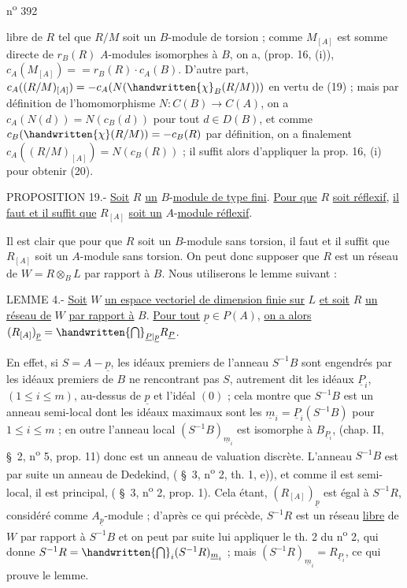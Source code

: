 n\textsuperscript{o} 392

libre de $R$ tel que $R/M$ soit un $B$-module de torsion ; comme $M_{[A]}$ est somme directe de $r_B(R)$ $A$-modules isomorphes à $B$, on a, (prop. 16, (i)), $c_A(M_{[A]})={}=r_B(R)\cdot c_A(B)$. D'autre part, $c_A((R/M)_{[A]})=-c_A(N(\handwritten{\chi}_B(R/M)))$ en vertu de (19) ; mais par définition de l'homomorphisme $N:C(B)\longrightarrow C(A)$, on a $c_A(N(d))=N(c_B(d))$ pour tout $d\in D(B)$, et comme $c_B(\handwritten{\chi}(R/M))=-c_B(R)$ par définition, on a finalement $c_A((R/M)_{[A]})=N(c_B(R))$ ; il suffit alors d'appliquer la prop. 16, (i) pour obtenir (20).

PROPOSITION 19.- \uline{Soit} $R$ \uline{un} $B$-\uline{module de type fini}. \uline{Pour que} $R$ \uline{soit réflexif}, \uline{il faut et il suffit que} $R_{[A]}$ \uline{soit un} $A$-\uline{module réflexif}.

Il est clair que pour que $R$ soit un $B$-module sans torsion, il faut et il suffit que $R_{[A]}$ soit un $A$-module sans torsion. On peut donc supposer que $R$ est un réseau de $W=R\otimes_B L$ par rapport à $B$. Nous utiliserons le lemme suivant :

LEMME 4.- \uline{Soit} $W$ \uline{un espace vectoriel de dimension finie sur} $L$ \uline{et soit} $R$ \uline{un réseau de} $W$ \uline{par rapport à} $B$. \uline{Pour tout} $\underline p\in P(A)$, \uline{on a alors} $(R_{[A]})_{\underline p}=\handwritten{\bigcap}_{\underline P\mid\underline p}R_{\underline P}$.

En effet, si $S=A-\underline p$, les idéaux premiers de l'anneau $S^{-1}B$ sont engendrés par les idéaux premiers de $B$ ne rencontrant pas $S$, autrement dit les idéaux $\underline P_i$, $(1\leq i\leq m)$, au-dessus de $\underline p$ et l'idéal $(0)$ ; cela montre que $S^{-1}B$ est un anneau semi-local dont les idéaux maximaux sont les $\underline m_i=\underline P_i(S^{-1}B)$ pour $1\leq i\leq m$ ; en outre l'anneau local $(S^{-1}B)_{\underline m_i}$ est isomorphe à $B_{\underline P_i}$, (chap. II, \S~2, n\textsuperscript{o} 5, prop. 11)\unsure{,} donc est un anneau de valuation discrète. L'anneau $S^{-1}B$ est par suite un anneau de Dedekind, ( \S~3, n\textsuperscript{o} 2, th. 1, e)), et comme il est semi-local, il est principal, ( \S~3, n\textsuperscript{o} 2, prop. 1). Cela étant, $(R_{[A]})_{\underline p}$ est égal à $S^{-1}R$, considéré comme $A_{\underline p}$-module ; d'après ce qui précède, $S^{-1}R$ est un réseau \uline{libre} de $W$ par rapport à $S^{-1}B$ et on peut par suite lui appliquer le th. 2 du n\textsuperscript{o} 2, qui donne $S^{-1}R=\handwritten{\bigcap}_i(S^{-1}R)_{\underline m_i}$ ; mais $(S^{-1}R)_{\underline m_i}=R_{\underline P_i}$, ce qui prouve le lemme.
